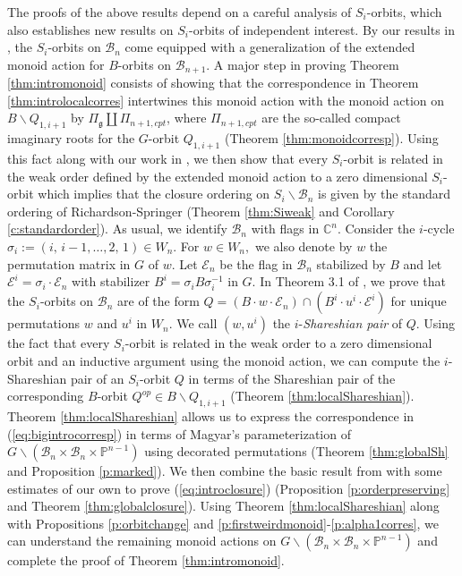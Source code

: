 \documentclass[12pt]{amsart}
\numberwithin{equation}{section}
\newcommand{\fg}{\mbox{${\mathfrak g}$}}
\newcommand{\C}{\mbox{${\mathbb C}$}}
\newcommand{\B}{\mathcal{B}}
\begin{document}
 The proofs of the above results depend on a careful analysis of $S_i$-orbits, which also establishes new results on $S_i$-orbits of independent interest.  By our results in \cite{Siorbits}, the $S_i$-orbits on $\B_n$ come equipped with a generalization of the extended monoid action for $B$-orbits on $\B_{n+1}$.  A major step in proving Theorem \ref{thm:intromonoid} consists of showing that the correspondence in Theorem \ref{thm:introlocalcorres} intertwines this monoid action with the monoid action on $B\backslash Q_{1,i+1}$ by $\Pi_{\fg}\coprod \Pi_{n+1, cpt}$, where $\Pi_{n+1, cpt}$ are the so-called compact imaginary roots for the $G$-orbit $Q_{1,i+1}$ (Theorem \ref{thm:monoidcorresp}).   Using this fact along with our work in \cite{CE21II}, we then show that every $S_{i}$-orbit is related in the weak order defined by the extended monoid action to a zero dimensional $S_{i}$-orbit which implies that the closure ordering on $S_{i}\backslash\B_{n}$ is given by the standard ordering of Richardson-Springer (Theorem \ref{thm:Siweak} and Corollary \ref{c:standardorder}).   As usual, we identify $\B_n$ with flags in $\C^n.$    Consider the $i$-cycle ${\sigma}_{i}:= (i,\,i-1,\dots, 2, \,1) \in W_n.$   For $w\in W_n,$ we also denote by $w$ the permutation matrix in $G$ of $w.$  Let $\mathcal{E}_n$ be the flag in $\B_n$ stabilized by $B$ and let $\mathcal{E}^{i} = \sigma_i \cdot \mathcal{E}_{n}$ with stabilizer $B^{i}=\sigma_i B \sigma_i^{-1}$ in $G.$  In Theorem 3.1 of \cite{Siorbits}, we prove that the $S_{i}$-orbits on $\B_{n}$ are of the form $Q=(B\cdot w \cdot \mathcal{E}_{n}) \cap (B^{i}\cdot u^{i} \cdot \mathcal{E}^{i})$  for unique permutations $w$ and $u^{i}$ in $W_{n}.$   We call $(w,u^{i})$ the $i$-\emph{Shareshian pair} of $Q.$   Using the fact that every $S_{i}$-orbit is related in the weak order to a zero dimensional orbit and an inductive argument using the monoid action, we can compute the $i$-Shareshian pair of an $S_{i}$-orbit $Q$ in terms of the Shareshian pair of the corresponding $B$-orbit $Q^{op}\in B\backslash Q_{1,i+1}$ (Theorem \ref{thm:localShareshian}).   Theorem \ref{thm:localShareshian} allows us to express the correspondence in (\ref{eq:bigintrocorresp}) in terms of Magyar's parameterization of $G\backslash(\B_{n}\times\B_{n}\times\mathbb{P}^{n-1})$ using decorated permutations (Theorem \ref{thm:globalSh} and Proposition \ref{p:marked}).  We then combine the basic result from \cite{Magyar} with some estimates of our own to prove (\ref{eq:introclosure}) (Proposition \ref{p:orderpreserving} and Theorem \ref{thm:globalclosure}). Using Theorem \ref{thm:localShareshian} along with Propositions \ref{p:orbitchange} and \ref{p:firstweirdmonoid}-\ref{p:alpha1corres}, we can understand the remaining monoid actions on  $G\backslash(\B_{n}\times\B_{n}\times\mathbb{P}^{n-1})$ and complete the proof of Theorem \ref{thm:intromonoid}.
\end{document}

